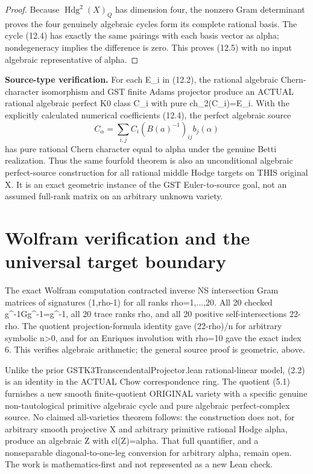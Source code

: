 \documentclass[11pt]{article}
\begin{document}
\begin{proof}
Because \(\operatorname{Hdg}^2(X)_Q\)
has dimension four, the
nonzero Gram determinant
proves the four genuinely
algebraic cycles form its
complete rational basis.
The cycle (12.4) has exactly
the same pairings with
each basis vector as alpha;
nondegeneracy implies the
difference is zero.
This proves (12.5) with
no input algebraic
representative of alpha.
\end{proof}

\noindent\textbf{Source-type verification.}
For each E_i in (12.2),
the rational algebraic
Chern-character isomorphism
and GST finite Adams
projector produce an
ACTUAL rational algebraic
perfect K0 class C_i with
pure ch_2(C_i)=E_i.
With the explicitly
calculated numerical
coefficients (12.4), the
perfect algebraic source
\[
      C_\alpha=
      \sum_{i,j}C_i
                (B(a)^{-1})_{ij}b_j(\alpha)
\]
has pure rational Chern
character equal to alpha
under the genuine Betti
realization. Thus the
same fourfold theorem
is also an unconditional
algebraic perfect-source
construction for all
rational middle Hodge
targets on THIS original X.
It is an exact geometric
instance of the GST
Euler-to-source goal,
not an assumed full-rank
matrix on an arbitrary
unknown variety.

\section{Wolfram verification and the universal target boundary}
The exact Wolfram computation contracted inverse
NS intersection Gram matrices of signatures
(1,rho-1) for all ranks rho=1,...,20.
All 20 checked g^{-1}Gg^{-1}=g^{-1},
all 20 trace ranks rho, and all 20
positive self-intersections 22-rho.
The quotient projection-formula identity
gave (22-rho)/n for arbitrary symbolic n>0,
and for an Enriques involution with rho=10
gave the exact index 6.
This verifies algebraic arithmetic; the
general source proof is geometric, above.

Unlike the prior GSTK3TranscendentalProjector.lean
rational-linear model, (2.2) is an identity
in the ACTUAL Chow correspondence ring.
The quotient (5.1) furnishes a new smooth
finite-quotient ORIGINAL variety with a specific
genuine non-tautological primitive algebraic
cycle and pure algebraic perfect-complex source.
No claimed all-varieties theorem follows:
the construction does not, for arbitrary
smooth projective X and arbitrary primitive
rational Hodge alpha, produce an algebraic
Z with cl(Z)=alpha. That full quantifier,
and a nonseparable diagonal-to-one-leg
conversion for arbitrary alpha, remain open.
The work is mathematics-first and
not represented as a new Lean check.
\end{document}

